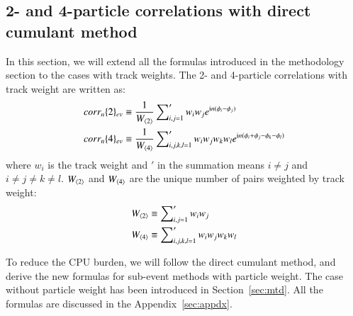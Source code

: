 \subsection{2- and 4-particle correlations with direct cumulant method}
In this section, we will extend all the formulas introduced in the methodology section to the cases with track weights. The 2- and 4-particle correlations with track weight are written as:
\begin{equation}
\begin{split}
corr_{n}\{2\}_{ev}&\equiv\frac{1}{W_{\left\langle 2\right\rangle}}\sum\nolimits_{i,j=1}^{\prime}w_{i}w_{j}e^{\text{i}n(\phi_{i}-\phi_{j})} \\
corr_{n}\{4\}_{ev}&\equiv\frac{1}{W_{\left\langle 4\right\rangle}}\sum\nolimits_{i,j,k,l=1}^{\prime}w_{i}w_{j}w_{k}w_{l}e^{\text{i}n(\phi_{i}+\phi_{j}-\phi_{k}-\phi_{l})}
\end{split}
\end{equation}
where $w_{i}$ is the track weight and $\prime$ in the summation means $i\neq j$ and $i\neq j\neq k\neq l$. $W_{\left\langle 2\right\rangle}$ and $W_{\left\langle 4\right\rangle}$ are the unique number of pairs weighted by track weight:
\begin{equation}
\begin{split}
W_{\left\langle 2\right\rangle}&\equiv\sum\nolimits_{i,j=1}^{\prime}w_{i}w_{j} \\
W_{\left\langle 4\right\rangle}&\equiv\sum\nolimits_{i,j,k,l=1}^{\prime}w_{i}w_{j}w_{k}w_{l}
\end{split}
\end{equation}

To reduce the CPU burden, we will follow the direct cumulant method, and derive the new formulas for sub-event methods with particle weight. The case without particle weight has been introduced in Section~\ref{sec:mtd}. All the formulas are discussed in the Appendix~\ref{sec:appdx}.



